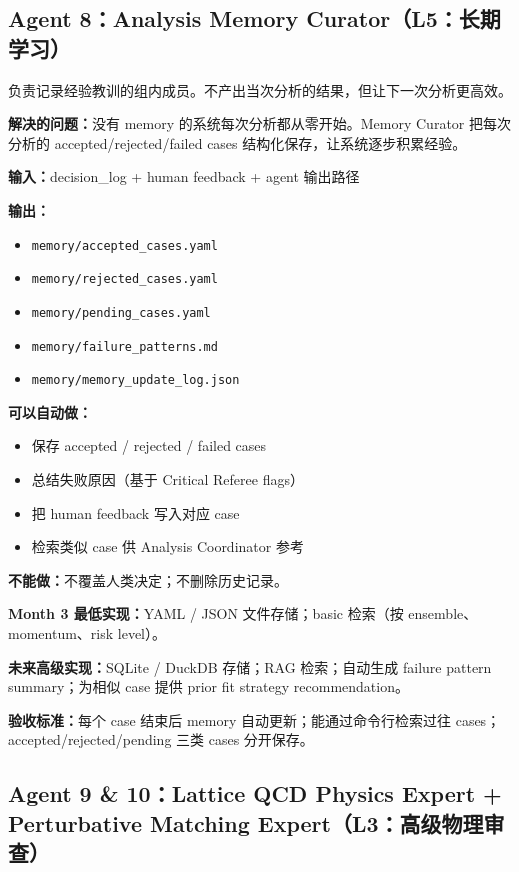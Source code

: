 \documentclass[11pt,a4paper,fontset=fandol]{ctexart}
\begin{document}
\subsection{Agent 8：Analysis Memory Curator（L5：长期学习）}

\begin{tcolorbox}[colback=gray!5,colframe=gray!50,title=真实科研组类比]
负责记录经验教训的组内成员。不产出当次分析的结果，但让下一次分析更高效。
\end{tcolorbox}

\textbf{解决的问题：}没有 memory 的系统每次分析都从零开始。Memory Curator 把每次分析的 accepted/rejected/failed cases 结构化保存，让系统逐步积累经验。

\textbf{输入：}decision\_log + human feedback + agent 输出路径

\textbf{输出：}
\begin{itemize}
  \item \texttt{memory/accepted\_cases.yaml}
  \item \texttt{memory/rejected\_cases.yaml}
  \item \texttt{memory/pending\_cases.yaml}
  \item \texttt{memory/failure\_patterns.md}
  \item \texttt{memory/memory\_update\_log.json}
\end{itemize}

\textbf{可以自动做：}
\begin{itemize}
  \item 保存 accepted / rejected / failed cases
  \item 总结失败原因（基于 Critical Referee flags）
  \item 把 human feedback 写入对应 case
  \item 检索类似 case 供 Analysis Coordinator 参考
\end{itemize}

\textbf{不能做：}不覆盖人类决定；不删除历史记录。

\textbf{Month 3 最低实现：}YAML / JSON 文件存储；basic 检索（按 ensemble、momentum、risk level）。

\textbf{未来高级实现：}SQLite / DuckDB 存储；RAG 检索；自动生成 failure pattern summary；为相似 case 提供 prior fit strategy recommendation。

\textbf{验收标准：}每个 case 结束后 memory 自动更新；能通过命令行检索过往 cases；accepted/rejected/pending 三类 cases 分开保存。

\subsection{Agent 9 \& 10：Lattice QCD Physics Expert + Perturbative Matching Expert（L3：高级物理审查）}
\end{document}
